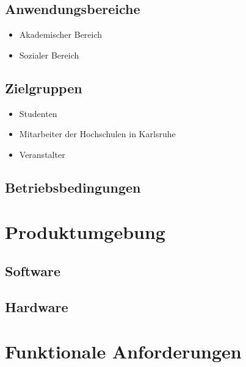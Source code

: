 \documentclass[parskip=full]{scrartcl}
\begin{document}
	\subsection{Anwendungsbereiche}
		\begin{itemize}
			\item Akademischer Bereich
			\item Sozialer Bereich
		\end{itemize}
		
	\subsection{Zielgruppen}
		\begin{itemize}
			\item Studenten
			\item Mitarbeiter der Hochschulen in Karlsruhe
			\item Veranstalter
		\end{itemize}
		
	\subsection{Betriebsbedingungen}
	
	
	\section{Produktumgebung}
	
	\subsection{Software}
	
	\subsection{Hardware}
	
	\newpage
	\section{Funktionale Anforderungen}
\end{document}
